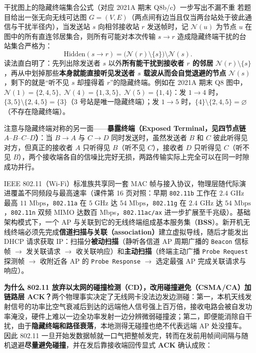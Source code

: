 \begin{StudyBlock}{干扰图上的隐藏终端集合公式（对应 2021A 期末 Q8b/c）}{一步写出不漏不重}
若题目给出一张无向无线可达图 $G = (V, E)$（两点间有边当且仅当两台站处于彼此通信与干扰半径内），当发送站 $s$ 向相邻接收站 $r$ 发送帧时，记 $\mathcal{N}(u)$ 为节点 $u$ 在图中的所有直连邻居集合，则所有可能对本次传输 $s \to r$ 造成隐藏终端干扰的台站集合严格为：
\[
\mathrm{Hidden}(s \to r) = \bigl(\mathcal{N}(r) \setminus \{s\}\bigr) \setminus \mathcal{N}(s).
\tag{7.1}
\]
读法直白明了：先列出除发送者 $s$ 以外\textbf{所有能干扰到接收者 $r$ 的邻居} $\mathcal{N}(r)\setminus\{s\}$，再从中划掉那些\textbf{本身就能直接听见发送者 $s$ 载波从而会自觉退避的节点} $\mathcal{N}(s)$，剩下的就是“听不见 $s$ 却撞得着 $r$”的隐藏终端。例如在 2021A 期末 Q8 图中，$\mathcal{N}(1)=\{2,4,5\},\; \mathcal{N}(4)=\{1,3,5\},\; \mathcal{N}(5)=\{1,4\}$：发 $1\to 4$ 时，$\{3,5\}\setminus\{2,4,5\}=\{3\}$（3 号站是唯一隐藏终端）；发 $1\to 5$ 时，$\{4\}\setminus\{2,4,5\}=\varnothing$（不存在隐藏终端）。
\end{StudyBlock}

注意与隐藏终端对称的另一面——\textbf{暴露终端（Exposed Terminal，见四节点链 $A\text{–}B\text{–}C\text{–}D$）}：当 $B \to A$ 与 $C \to D$ 同时发送时，虽然发送者 $B$ 和 $C$ 彼此听得见对方，但真正的接收者 $A$ 只听得见 $B$（听不见 $C$），接收者 $D$ 只听得见 $C$（听不见 $B$），两个接收端各自的信噪比完好无损，两路传输实际上完全可以在同一时隙成功并行。



IEEE 802.11（Wi-Fi）标准族共享同一套 MAC 帧与接入协议，物理层随代际演进覆盖不同频段与最高速率（课件第 16 页对照：早期 \texttt{802.11b} 工作在 $2.4\text{ GHz}$ 最高 $11\text{ Mbps}$，\texttt{802.11a} 在 $5\text{ GHz}$ 达 $54\text{ Mbps}$，\texttt{802.11g} 在 $2.4\text{ GHz}$ 达 $54\text{ Mbps}$，\texttt{802.11n} 双频 MIMO 达数百 Mbps，\texttt{802.11ac/ax} 进一步扩展至千兆级）。基础架构模式下，一个 AP 与关联到它的无线终端组成基本服务集（\textbf{BSS}）。新开机无线终端必须先完成\textbf{信道扫描与关联（association）}建立虚拟导线，随后才能发出 DHCP 请求获取 IP：扫描分\textbf{被动扫描}（静听各信道 AP 周期广播的 \texttt{Beacon} 信标帧 $\to$ 发关联请求 $\to$ 收关联响应）和\textbf{主动扫描}（终端主动广播 \texttt{Probe Request} 探测帧 $\to$ 收附近各 AP 的 \texttt{Probe Response} $\to$ 选定最强 AP 完成关联请求与响应）。

\textbf{为什么 802.11 放弃以太网的碰撞检测（CD），改用碰撞避免（CSMA/CA）加链路层 ACK？}两个物理事实决定了无线网卡没法边发边测碰：第一，本机天线发射信号的功率比空气衰减后到达的远端他人信号强上百万倍，接收电路会被自发功率淹没，硬件上难以一边全功率发射一边分辨微弱碰撞波；第二，即便能消除自干扰，由于\textbf{隐藏终端和路径衰落}，本地测得无碰撞也绝不代表远端 AP 处没撞车。因此 802.11 一旦开始发数据帧就一口气把整帧发完，转而在发前用帧间间隔与随机退避\textbf{尽量避免碰撞}，并在发后靠接收端回传显式 \textbf{ACK} 确认成败：

